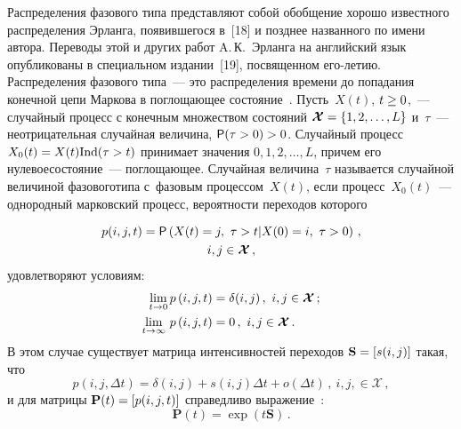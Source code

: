 {\begin{multicols}{2}
  Распределения фазового типа представляют собой обобщение хорошо 
известного распределения Эрланга, появившегося в~[18] и позднее названного 
по имени автора. Переводы этой и других работ A.\,К.~Эрланга на английский 
язык опубликованы в специальном издании~[19], посвященном его-ле\-тию. 
Распределения фазового типа~--- это распределения времени до попадания 
конечной цепи Маркова в поглощающее состояние~\cite{6-n}. Пусть~$X(t)$,\linebreak 
$t\hm\geq 0$,~--- случайный процесс с конечным множеством состояний 
$\boldsymbol{\mathcal{X}} \hm= \{1, 2, \ldots , L\}$ и~$\tau$~--- 
не\-от\-ри\-ца\-тель\-ная случайная величина, ${\sf P}(\tau>0)\hm> 0$. Случайный 
процесс $X_0(t)\hm= X(t)\mathrm{Ind}(\tau>t)$ принимает значения $0, 1, 2, 
\ldots , L$, причем его нулевое\linebreak состояние~--- поглощающее. Случайная 
величина~$\tau$ называется случайной величиной фазового\linebreak типа с~фазовым 
процессом~$X(t)$, если процесс~$X_0(t)$~--- однородный марковский процесс, %
вероятности переходов которого

\noindent
\begin{multline*}
  p(i,j,t)={\sf P}\left(X(t)=j,\ \tau>t\vert X(0)=i,\
   \tau>0\right)\,,\\  i,j\in   \boldsymbol{\mathcal{X}}\,,
  \end{multline*}
удовлетворяют условиям: 
\begin{align}
\lim\limits_{t\to 0} p\left(i,j,t\right)&= \delta(i,j)\,,\ i,j\in \boldsymbol{\mathcal{X}}\,;
\notag\\
\lim\limits_{t\to \infty}\, p\left(i,j,t\right)&= 0\,,\ i,j\in \boldsymbol{\mathcal{X}}\,.
\label{e2-n}
\end{align}
  В этом случае существует матрица интенсивностей переходов 
$\mathbf{S}\hm= [s(i,j)]$ такая, что
  $$
  p(i,j,\Delta t) =\delta(i,j)+s(i,j)\Delta t +o(\Delta t)\,,\ i,j,\in 
\boldsymbol{\mathcal{X}}\,,
  $$
и для матрицы $\mathbf{P}(t)\hm= [p(i,j,t)]$ справедливо выражение~\cite{20-n}:
\begin{equation}
\mathbf{P}(t)=\exp \left( t\mathbf{S}\right)\,.
\label{e3-n}
\end{equation}
  

\end{multicols}}
